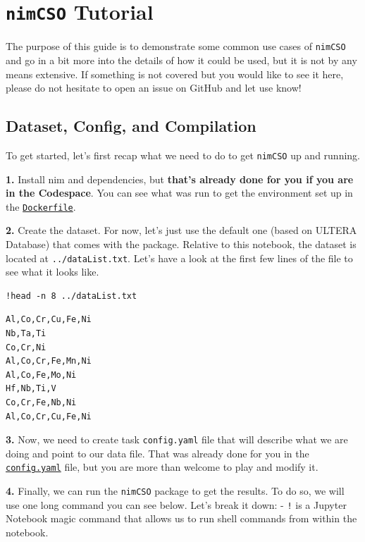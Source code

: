 \chapter{\texttt{nimCSO} Tutorial} \label{chap:nimplextutorial2}

The purpose of this guide is to demonstrate some common use cases of
\texttt{nimCSO} and go in a bit more into the details
of how it could be used, but it is not by any means extensive. If
something is not covered but you would like to see it here, please do
not hesitate to open an issue on GitHub and let use know!

\hypertarget{dataset-config-and-compilation}{%
\section{Dataset, Config, and
Compilation}\label{nimcsotutorial:dataset-config-and-compilation}}

To get started, let's first recap what we need to do to get
\texttt{nimCSO} up and running.

\textbf{1.} Install nim and dependencies, but \textbf{that's already
done for you if you are in the Codespace}. You can see what was run to
get the environment set up in the
\href{../.devcontainer/Dockerfile}{\texttt{Dockerfile}}.

\textbf{2.} Create the dataset. For now, let's just use the default one
(based on ULTERA Database) that comes with the package. Relative to this
notebook, the dataset is located at
\texttt{../dataList.txt}. Let's have a look at the
first few lines of the file to see what it looks like.

\begin{verbatim}
!head -n 8 ../dataList.txt
\end{verbatim}

\begin{verbatim}
Al,Co,Cr,Cu,Fe,Ni
Nb,Ta,Ti
Co,Cr,Ni
Al,Co,Cr,Fe,Mn,Ni
Al,Co,Fe,Mo,Ni
Hf,Nb,Ti,V
Co,Cr,Fe,Nb,Ni
Al,Co,Cr,Cu,Fe,Ni
\end{verbatim}

\textbf{3.} Now, we need to create task
\texttt{config.yaml} file that will describe what we
are doing and point to our data file. That was already done for you in
the \href{config.yaml}{\texttt{config.yaml}} file, but
you are more than welcome to play and modify it.

\textbf{4.} Finally, we can run the \texttt{nimCSO}
package to get the results. To do so, we will use one long command you
can see below. Let's break it down: - \passthrough{\lstinline"!"} is a
Jupyter Notebook magic command that allows us to run shell commands from
within the notebook.

